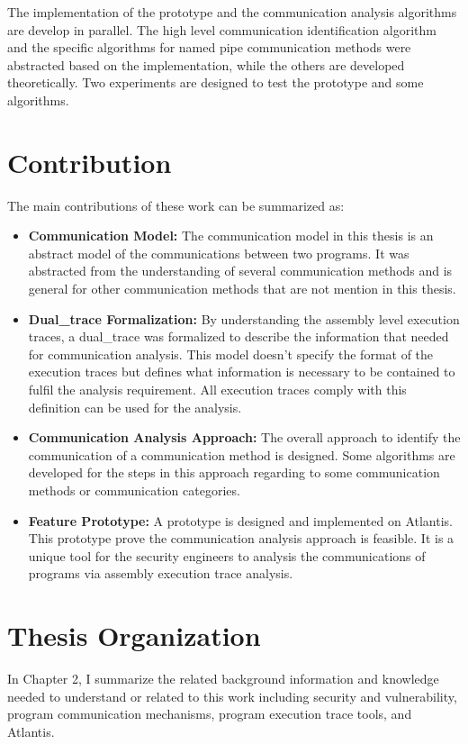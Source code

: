 The implementation of the prototype and the communication analysis algorithms are develop in parallel. The high level communication identification algorithm and the specific algorithms for named pipe communication methods were abstracted based on the implementation, while the others are developed theoretically. Two experiments are designed to test the prototype and some algorithms. 


\section{Contribution}
The main contributions of these work can be summarized as:
\begin{itemize}
  \item \textbf{Communication Model:} The communication model in this thesis is an abstract model of the communications between two programs. It was abstracted from the understanding of several communication methods and is general for other communication methods that are not mention in this thesis.
  \item \textbf{Dual\_trace Formalization:} By understanding the assembly level execution traces, a dual\_trace was formalized to describe the information that needed for communication analysis. This model doesn't specify the format of the execution traces but defines what information is necessary to be contained to fulfil the analysis requirement. All execution traces comply with this definition can be used for the analysis.
  \item \textbf{Communication Analysis Approach:} The overall approach to identify the communication of a communication method is designed. Some algorithms are developed for the steps in this approach regarding to some communication methods or communication categories.
  \item \textbf{Feature Prototype:} A prototype is designed and implemented on Atlantis. This prototype prove the communication analysis approach is feasible. It is a unique tool for the security engineers to analysis the communications of programs via assembly execution trace analysis.
\end{itemize}

\section{Thesis Organization}
In Chapter 2, I summarize the related background information and knowledge needed to understand or related to this work including security and vulnerability, program communication mechanisms, program execution trace tools, and Atlantis. 

